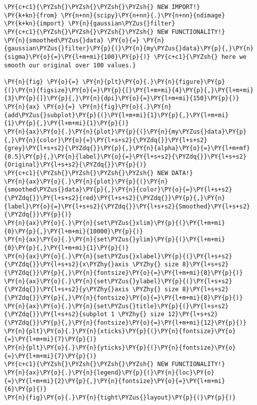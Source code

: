     \begin{tcolorbox}[breakable, size=fbox, boxrule=1pt, pad at break*=1mm,colback=cellbackground, colframe=cellborder]
\begin{Verbatim}[commandchars=\\\{\}]
\PY{c+c1}{\PYZsh{}\PYZsh{}\PYZsh{}\PYZsh{} NEW IMPORT!}
\PY{k+kn}{from} \PY{n+nn}{scipy}\PY{n+nn}{.}\PY{n+nn}{ndimage} \PY{k+kn}{import} \PY{n}{gaussian\PYZus{}filter}
\PY{c+c1}{\PYZsh{}\PYZsh{}\PYZsh{}\PYZsh{} NEW FUNCTIONALITY!}
\PY{n}{smoothed\PYZus{}data} \PY{o}{=} \PY{n}{gaussian\PYZus{}filter}\PY{p}{(}\PY{n}{my\PYZus{}data}\PY{p}{,}\PY{n}{sigma}\PY{o}{=}\PY{l+m+mi}{100}\PY{p}{)} \PY{c+c1}{\PYZsh{} here we smooth our original over 100 values.}

\PY{n}{fig} \PY{o}{=} \PY{n}{plt}\PY{o}{.}\PY{n}{figure}\PY{p}{(}\PY{n}{figsize}\PY{o}{=}\PY{p}{[}\PY{l+m+mi}{4}\PY{p}{,}\PY{l+m+mi}{3}\PY{p}{]}\PY{p}{,}\PY{n}{dpi}\PY{o}{=}\PY{l+m+mi}{150}\PY{p}{)} 
\PY{n}{ax} \PY{o}{=} \PY{n}{fig}\PY{o}{.}\PY{n}{add\PYZus{}subplot}\PY{p}{(}\PY{l+m+mi}{1}\PY{p}{,}\PY{l+m+mi}{1}\PY{p}{,}\PY{l+m+mi}{1}\PY{p}{)}
\PY{n}{ax}\PY{o}{.}\PY{n}{plot}\PY{p}{(}\PY{n}{my\PYZus{}data}\PY{p}{,}\PY{n}{color}\PY{o}{=}\PY{l+s+s2}{\PYZdq{}}\PY{l+s+s2}{grey}\PY{l+s+s2}{\PYZdq{}}\PY{p}{,}\PY{n}{alpha}\PY{o}{=}\PY{l+m+mf}{0.5}\PY{p}{,}\PY{n}{label}\PY{o}{=}\PY{l+s+s2}{\PYZdq{}}\PY{l+s+s2}{Original}\PY{l+s+s2}{\PYZdq{}}\PY{p}{)}
\PY{c+c1}{\PYZsh{}\PYZsh{}\PYZsh{}\PYZsh{} NEW DATA!}
\PY{n}{ax}\PY{o}{.}\PY{n}{plot}\PY{p}{(}\PY{n}{smoothed\PYZus{}data}\PY{p}{,}\PY{n}{color}\PY{o}{=}\PY{l+s+s2}{\PYZdq{}}\PY{l+s+s2}{red}\PY{l+s+s2}{\PYZdq{}}\PY{p}{,}\PY{n}{label}\PY{o}{=}\PY{l+s+s2}{\PYZdq{}}\PY{l+s+s2}{Smoothed}\PY{l+s+s2}{\PYZdq{}}\PY{p}{)}
\PY{n}{ax}\PY{o}{.}\PY{n}{set\PYZus{}xlim}\PY{p}{(}\PY{l+m+mi}{0}\PY{p}{,}\PY{l+m+mi}{10000}\PY{p}{)}
\PY{n}{ax}\PY{o}{.}\PY{n}{set\PYZus{}ylim}\PY{p}{(}\PY{l+m+mi}{0}\PY{p}{,}\PY{l+m+mi}{1}\PY{p}{)}
\PY{n}{ax}\PY{o}{.}\PY{n}{set\PYZus{}xlabel}\PY{p}{(}\PY{l+s+s2}{\PYZdq{}}\PY{l+s+s2}{x\PYZhy{}axis \PYZhy{} size 8}\PY{l+s+s2}{\PYZdq{}}\PY{p}{,}\PY{n}{fontsize}\PY{o}{=}\PY{l+m+mi}{8}\PY{p}{)}
\PY{n}{ax}\PY{o}{.}\PY{n}{set\PYZus{}ylabel}\PY{p}{(}\PY{l+s+s2}{\PYZdq{}}\PY{l+s+s2}{y\PYZhy{}axis \PYZhy{} size 8}\PY{l+s+s2}{\PYZdq{}}\PY{p}{,}\PY{n}{fontsize}\PY{o}{=}\PY{l+m+mi}{8}\PY{p}{)}
\PY{n}{ax}\PY{o}{.}\PY{n}{set\PYZus{}title}\PY{p}{(}\PY{l+s+s2}{\PYZdq{}}\PY{l+s+s2}{subplot 1 \PYZhy{} size 12}\PY{l+s+s2}{\PYZdq{}}\PY{p}{,}\PY{n}{fontsize}\PY{o}{=}\PY{l+m+mi}{12}\PY{p}{)}
\PY{n}{plt}\PY{o}{.}\PY{n}{xticks}\PY{p}{(}\PY{n}{fontsize}\PY{o}{=}\PY{l+m+mi}{7}\PY{p}{)}
\PY{n}{plt}\PY{o}{.}\PY{n}{yticks}\PY{p}{(}\PY{n}{fontsize}\PY{o}{=}\PY{l+m+mi}{7}\PY{p}{)}
\PY{c+c1}{\PYZsh{}\PYZsh{}\PYZsh{}\PYZsh{} NEW FUNCTIONALITY!}
\PY{n}{ax}\PY{o}{.}\PY{n}{legend}\PY{p}{(}\PY{n}{loc}\PY{o}{=}\PY{l+m+mi}{2}\PY{p}{,}\PY{n}{fontsize}\PY{o}{=}\PY{l+m+mi}{6}\PY{p}{)}
\PY{n}{fig}\PY{o}{.}\PY{n}{tight\PYZus{}layout}\PY{p}{(}\PY{p}{)}
\end{Verbatim}
\end{tcolorbox}

